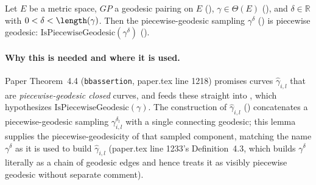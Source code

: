 \begin{lemma}
  Let $E$ be a metric space, $GP$ a geodesic pairing on $E$ (),
  $\gamma \in \Theta(E)$ (), and $\delta \in \mathbb{R}$ with $0 < \delta <
  \length(\gamma)$. Then the piecewise-geodesic sampling $\gamma^\delta$ ()
  is piecewise geodesic: $\mathrm{IsPiecewiseGeodesic}(\gamma^\delta)$ ().

  \paragraph{Why this is needed and where it is used.} Paper Theorem~4.4 (\texttt{bbassertion},
  paper.tex line 1218) promises curves $\hat\gamma_{i,l}$ that are \emph{piecewise-geodesic closed}
  curves, and  feeds these straight into , which
  hypothesizes $\mathrm{IsPiecewiseGeodesic}(\gamma)$. The construction of $\hat\gamma_{i,l}$
  () concatenates a piecewise-geodesic sampling $\gamma^{\delta_l}_{i,l}$ with a
  single connecting geodesic; this lemma supplies the piecewise-geodesicity of that sampled
  component, matching the name $\gamma^\delta$ as it is used to build $\hat\gamma_{i,l}$
  (paper.tex line 1233's Definition~4.3, which builds $\gamma^\delta$ literally as a chain of
  geodesic edges and hence treats it as visibly piecewise geodesic without separate comment).
\end{lemma}
